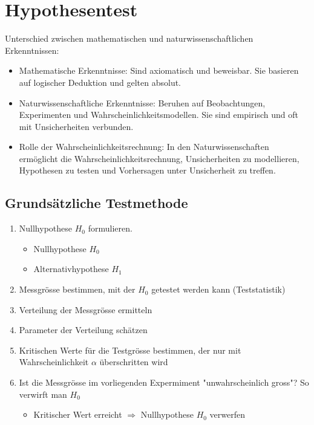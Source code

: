 \documentclass[../Main.tex]{subfiles}
\begin{document}
\section{Hypothesentest}

Unterschied zwischen mathematischen und naturwissenschaftlichen Erkenntnissen:
\begin{itemize}
    \item Mathematische Erkenntnisse: Sind axiomatisch und beweisbar. Sie basieren auf logischer Deduktion und gelten absolut.
    \item Naturwissenschaftliche Erkenntnisse: Beruhen auf Beobachtungen, Experimenten und Wahrscheinlichkeitsmodellen. Sie sind empirisch und oft mit Unsicherheiten verbunden.
    \item Rolle der Wahrscheinlichkeitsrechnung: In den Naturwissenschaften ermöglicht die Wahrscheinlichkeitsrechnung, Unsicherheiten zu modellieren, Hypothesen zu testen und Vorhersagen unter Unsicherheit zu treffen.
\end{itemize}

\subsection{Grundsätzliche Testmethode}
\begin{enumerate}
    \item Nullhypothese \(H_0\) formulieren.
    \begin{itemize}
        \item Nullhypothese \(H_0\)
        \item Alternativhypothese \(H_1\)
    \end{itemize}
    \item Messgrösse bestimmen, mit der \(H_0\) getestet werden kann (Teststatistik)
    \item Verteilung der Messgrösse ermitteln
    \item Parameter der Verteilung schätzen
    \item Kritischen Werte für die Testgrösse bestimmen, der nur mit Wahrscheinlichkeit \(\alpha\) überschritten wird
    \item Ist die Messgrösse im vorliegenden Expermiment "unwahrscheinlich gross"? So verwirft man \(H_0\)
    \begin{itemize}
        \item Kritischer Wert erreicht \(\Rightarrow\) Nullhypothese \(H_0\) verwerfen
    \end{itemize}
\end{enumerate}
\end{document}
